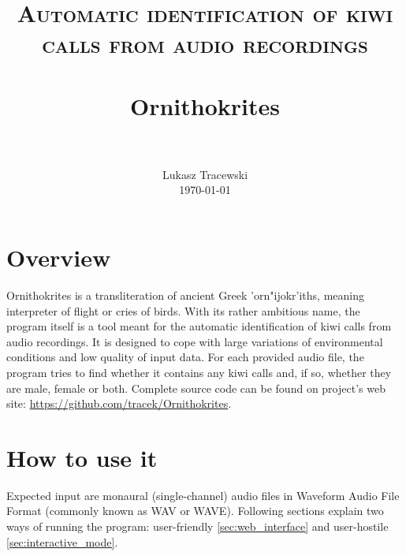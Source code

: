 \documentclass[paper=a4, fontsize=11pt]{scrartcl}	%
\title{
		\usefont{OT1}{bch}{b}{n}
		\normalfont \normalsize \textsc{Automatic identification of kiwi calls from audio recordings} \\ [25pt]
		\horrule{0.5pt} \\[0.4cm]
		\huge Ornithokrites \\
		\horrule{2pt} \\[0.5cm]
}
\author{
		\normalfont 					\normalsize
        Lukasz Tracewski\\[-3pt]		\normalsize
        \today
}
\date{}
\numberwithin{equation}{section}		%
\numberwithin{figure}{section}			%
\numberwithin{table}{section}				%
\begin{document}
\maketitle
\section{Overview}
Ornithokrites is a transliteration of ancient Greek {'orn"ijokr'iths}, meaning interpreter of flight or cries of birds. With its rather ambitious name, the program itself is a tool meant for the automatic identification of kiwi calls from audio recordings. It is designed to cope with large variations of environmental conditions and low quality of input data. For each provided audio file, the program tries to find whether it contains any kiwi calls and, if so, whether they are male, female or both. \newline
Complete source code can be found on project's web site: \url{https://github.com/tracek/Ornithokrites}.

\section{How to use it}
Expected input are monaural (single-channel) audio files in Waveform Audio File Format (commonly known as WAV or WAVE). Following sections explain two ways of running the program: user-friendly \ref{sec:web_interface} and user-hostile \ref{sec:interactive_mode}.
\end{document}
